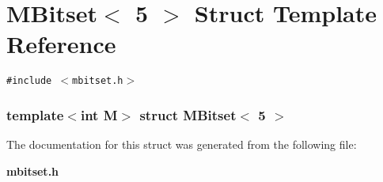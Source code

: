 \section{MBitset$<$ 5 $>$ Struct Template Reference}
\label{structMBitset_3_015_01_4}
{\tt \#include $<$mbitset.h$>$}

\subsubsection*{template$<$int M$>$ struct MBitset$<$ 5 $>$}



The documentation for this struct was generated from the following file:\begin{CompactItemize}
\item 
{\bf mbitset.h}\end{CompactItemize}
